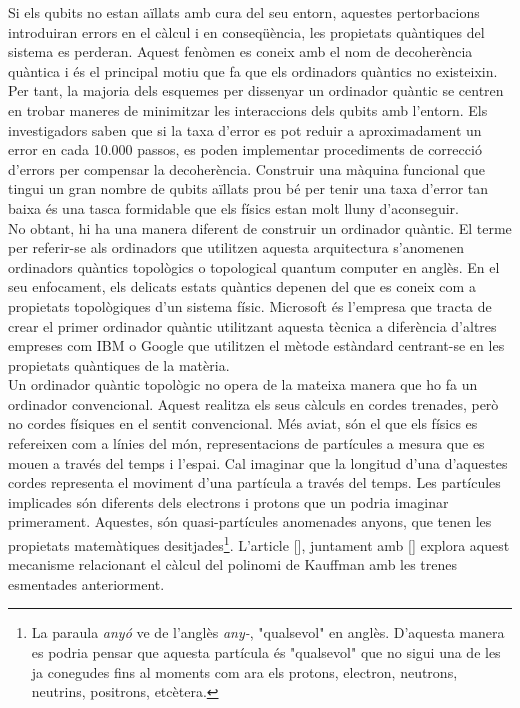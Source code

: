 Si els qubits no estan aïllats amb cura del seu entorn, aquestes pertorbacions introduiran errors en el càlcul i en conseqüència, les propietats quàntiques del sistema es perderan. Aquest fenòmen es coneix amb el nom de decoherència quàntica i és el principal motiu que fa que els ordinadors quàntics no existeixin.\\

Per tant, la majoria dels esquemes per dissenyar un ordinador quàntic se centren en trobar maneres de minimitzar les interaccions dels qubits amb l'entorn. Els investigadors saben que si la taxa d'error es pot reduir a aproximadament un error en cada 10.000 passos, es poden implementar procediments de correcció d'errors per compensar la decoherència. Construir una màquina funcional que tingui un gran nombre de qubits aïllats prou bé per tenir una taxa d'error tan baixa és una tasca formidable que els físics estan molt lluny d'aconseguir.\\

No obtant, hi ha una manera diferent de construir un ordinador quàntic. El terme per referir-se als ordinadors que utilitzen aquesta arquitectura s'anomenen ordinadors quàntics topològics o topological quantum computer en anglès. En el seu enfocament, els delicats estats quàntics depenen del que es coneix com a propietats topològiques d'un sistema físic. Microsoft és l'empresa que tracta de crear el primer ordinador quàntic utilitzant aquesta tècnica a diferència d'altres empreses com IBM o Google que utilitzen el mètode estàndard centrant-se en les propietats quàntiques de la matèria.\\

Un ordinador quàntic topològic no opera de la mateixa manera que ho fa un ordinador convencional. Aquest realitza els seus càlculs en cordes trenades, però no cordes físiques en el sentit convencional. Més aviat, són el que els físics es refereixen com a línies del món, representacions de partícules a mesura que es mouen a través del temps i l'espai. Cal imaginar que la longitud d'una d'aquestes cordes representa el moviment d'una partícula a través del temps. Les partícules implicades són diferents dels electrons i protons que un podria imaginar primerament. Aquestes, són quasi-partícules anomenades anyons, que tenen les propietats matemàtiques desitjades\footnote{La paraula \textit{anyó} ve de l'anglès \textit{any-}, "qualsevol" en anglès. D'aquesta manera es podria pensar que aquesta partícula és "qualsevol" que no sigui una de les ja conegudes fins al moments com ara els protons, electron, neutrons, neutrins, positrons, etcètera.}. L'article [\cite{braidtopologiesforquantumcomputation}], juntament amb [\cite{topologicalquantumcomputation}] explora aquest mecanisme relacionant el càlcul del polinomi de Kauffman amb les trenes esmentades anteriorment.\\

